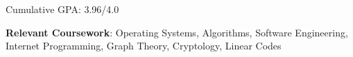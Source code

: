 
Cumulative GPA: 3.96/4.0

\divider

\textbf{Relevant Coursework}: Operating Systems, Algorithms, Software Engineering, Internet Programming, Graph Theory, Cryptology, Linear Codes

